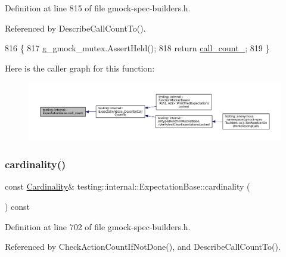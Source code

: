 Definition at line 815 of file gmock-\/spec-\/builders.\+h.



Referenced by Describe\+Call\+Count\+To().


\begin{DoxyCode}
816                                                     \{
817     g\_gmock\_mutex.AssertHeld();
818     \textcolor{keywordflow}{return} \hyperlink{classtesting_1_1internal_1_1ExpectationBase_aea95d46f7583566e3f7a081b0668ad4c}{call\_count\_};
819   \}
\end{DoxyCode}
Here is the caller graph for this function\+:
\nopagebreak
\begin{figure}[H]
\begin{center}
\leavevmode
\includegraphics[width=350pt]{classtesting_1_1internal_1_1ExpectationBase_aacc0399271907194ac1627439f65047a_icgraph}
\end{center}
\end{figure}
\mbox{\label{classtesting_1_1internal_1_1ExpectationBase_a1399efffbc8675510a15c6ba1f18184b}} 
\subsubsection{\texorpdfstring{cardinality()}{cardinality()}}
{\footnotesize\ttfamily const \hyperlink{classtesting_1_1Cardinality}{Cardinality}\& testing\+::internal\+::\+Expectation\+Base\+::cardinality (\begin{DoxyParamCaption}{ }\end{DoxyParamCaption}) const\hspace{0.3cm}{\ttfamily [inline]}}



Definition at line 702 of file gmock-\/spec-\/builders.\+h.



Referenced by Check\+Action\+Count\+If\+Not\+Done(), and Describe\+Call\+Count\+To().


